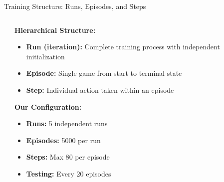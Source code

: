\documentclass[aspectratio=169]{beamer}
\begin{document}
\begin{frame}{Training Structure: Runs, Episodes, and Steps}
    \begin{columns}
        \begin{column}{0.55\textwidth}
            \begin{algorithm}[H]
                \caption{Q-Learning Training Structure}
                \SetAlgoLined
                \footnotesize
            \end{algorithm}
        \end{column}
        \begin{column}{0.4\textwidth}
            \textbf{Hierarchical Structure:}
            \begin{itemize}
                \item \textbf{Run (iteration):} Complete training process with independent initialization
                \item \textbf{Episode:} Single game from start to terminal state
                \item \textbf{Step:} Individual action taken within an episode
            \end{itemize}
            
            \textbf{Our Configuration:}
            \begin{itemize}
                \item \textbf{Runs:} 5 independent runs
                \item \textbf{Episodes:} 5000 per run
                \item \textbf{Steps:} Max 80 per episode
                \item \textbf{Testing:} Every 20 episodes
            \end{itemize}
        \end{column}
    \end{columns}
\end{frame}
\end{document}
